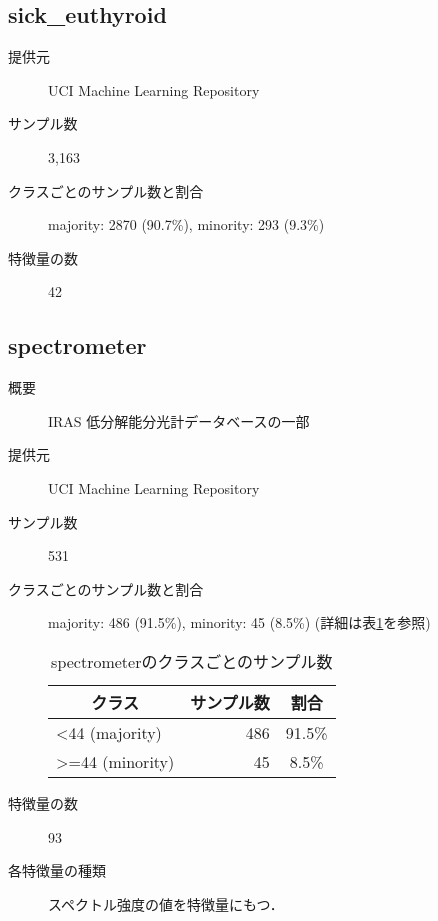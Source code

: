 \subsection{sick\_euthyroid}
\begin{description}
    \item[提供元] UCI Machine Learning Repository\cite{thyroid}
    \item[サンプル数] 3,163
    \item[クラスごとのサンプル数と割合] majority: 2870 (90.7\%), minority: 293 (9.3\%) 

    \item[特徴量の数] 42
\end{description}


\subsection{spectrometer}
\begin{description}
    \item[概要] IRAS 低分解能分光計データベースの一部\cite{spectrometer}
    \item[提供元] UCI Machine Learning Repository
    \item[サンプル数] 531
    \item[クラスごとのサンプル数と割合] majority: 486 (91.5\%), minority: 45 (8.5\%) (詳細は表\ref{tab:spectrometer}を参照)

        \begin{table}[htbp]
            \centering
            \caption{spectrometerのクラスごとのサンプル数}
            \label{tab:spectrometer}
            \begin{tabular}{lrc} \hline
                \multicolumn{1}{c}{クラス}&
                \multicolumn{1}{c}{サンプル数}&
                \multicolumn{1}{c}{割合}\\
                \hline
                \hline
                <44 (majority)& 486 & 91.5\% \\
                >=44 (minority)& 45 & 8.5\% \\
                \hline
            \end{tabular}
        \end{table}

    \item[特徴量の数] 93
    \item[各特徴量の種類] スペクトル強度の値を特徴量にもつ．
        
\end{description}

